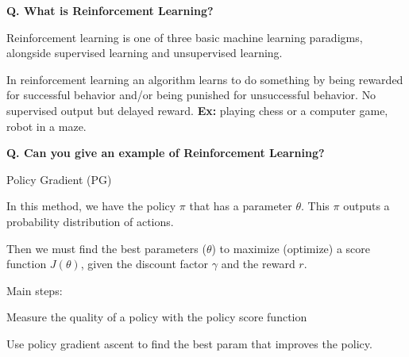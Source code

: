 \begin{frame}[fragile]{\textbf{Q. What is Reinforcement Learning?}}
  \begin{wideitemize}
    \item Reinforcement learning is one of three basic machine learning paradigms, alongside
    supervised learning and unsupervised learning.
    \item In reinforcement learning an algorithm learns to do something by being
    rewarded for successful behavior and/or being punished for unsuccessful
    behavior. {\footnotesize No supervised output but delayed reward.
      \textbf{Ex:} playing chess or a computer game, robot in a maze.}
  \end{wideitemize}
\end{frame}


\begin{frame}[fragile]{\textbf{Q. Can you give an example of Reinforcement Learning?}}
  \begin{wideitemize}
    \item Policy Gradient (PG)
    \begin{wideitemize}
      \item In this method, we have the policy $\pi$ that has a parameter $\theta$. This $\pi$
      outputs a probability distribution of actions.
      \item Then we must find the best parameters ($\theta$) to maximize (optimize) a score
      function $J(\theta)$, given the discount factor $\gamma$ and the reward $r.$
      \item Main steps:\medskip
      \begin{wideitemize}
        \item Measure the quality of a policy with the policy score function
        \item Use policy gradient ascent to find the best param that improves the policy.
      \end{wideitemize}
    \end{wideitemize}
  \end{wideitemize}
\end{frame}

